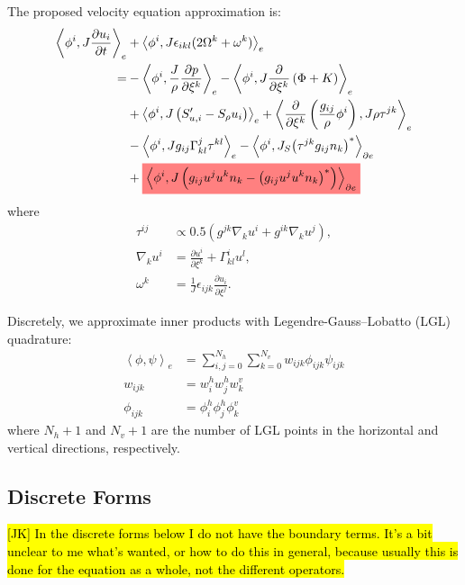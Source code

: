 \documentclass{report}
\newcommand{\inner}[2]{ \left\langle #1, #2 \right\rangle }
\newcommand{\highlight}[1]{\colorbox{red!50}{$\displaystyle#1$}}
\begin{document}
The proposed velocity equation approximation is:
\begin{align}\label{e:var_equations_coord_hor_vert_mome}
    \inner{\phi^i}{J\frac{\partial  u_i}{\partial t}}_{e}&
    + \inner{\phi^i}{J\epsilon_{ikl}(2\Omega^k + \omega^k)}_{e}
    \nonumber\\
    =&
    -\inner{\phi^{i}}{\frac{J}{\rho}\frac{\partial p}{\partial \xi^k}}_{e}
    - \inner{\phi^i}{ J \frac{\partial}{\partial \xi^k} \left(\Phi + K \right)}_{e}
    \nonumber\\
    &
    +\inner{\phi^i }{J\left(S'_{u,i}-S_{\rho}u_i\right)}_{e}
    +\inner{
    \frac{\partial}{\partial \xi^{k}}\left(
    \frac{g_{ij}}{\rho}
    \phi^{i}
    \right)
    }{
    J\rho\tau^{jk}
    }_{e}
    \nonumber\\
    &
    -
    \inner{\phi^{i}}{Jg_{ij} \Gamma_{kl}^{j} \tau^{kl}}_{e}
    -
    \inner{\phi^{i}}{J_{S} {\left(\tau^{jk} g_{ij}n_{k}\right)}^{*}}_{\partial e}
    \nonumber\\
    &
    +
    \highlight{
    \inner{\phi^i}{J
    \left(
    g_{ij}u^{j}u^{k}n_{k}
    -
    {\left(g_{ij}u^{j}u^{k}n_{k}\right)}^{*}
    \right)}_{\partial e}
    }
    \end{align}
    where 
    \begin{align}
    \tau^{ij} &\propto 0.5 (g^{jk} \nabla_k u^i + g^{ik} \nabla_k u^j),\\
    \nabla_k u^i &= \frac{\partial u^i}{\partial \xi^k} + \Gamma_{kl}^i u^{l},\\
    \omega^{k} &= \frac{1}{J} \epsilon_{ijk} \frac{\partial u_{i}}{\partial \xi^{j}}.
\end{align}

Discretely, we approximate inner products with Legendre-Gauss–Lobatto (LGL) quadrature:
\begin{align}
    \inner{\phi}{\psi}_{e} &= \sum_{i,j=0}^{N_h}\sum_{k=0}^{N_v}w_{ijk}\phi_{ijk}\psi_{ijk}\\
    w_{ijk} &= w_i^h w_j^h w_k^v\\
    \phi_{ijk} &= \phi_i^h \phi_j^h \phi_k^v
\end{align}
where $N_h+1$ and $N_v+1$ are the number of LGL points in the horizontal and vertical directions, respectively.

\subsection*{Discrete Forms}

\hl{[JK] In the discrete forms below I do not have the boundary terms.
It's a bit unclear to me what's wanted, or how to do this in general, because
usually this is done for the equation as a whole, not the different operators.}
\end{document}

